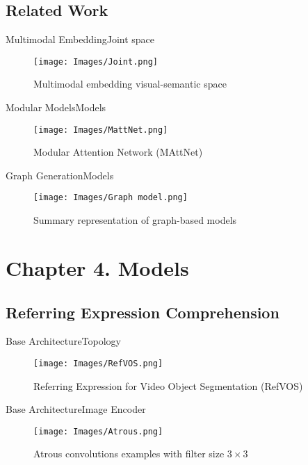 \documentclass{beamer}
\begin{document}
\subsection{Related Work}

\begin{frame}{Multimodal Embedding}{Joint space}
  \begin{figure}
    \texttt{[image: Images/Joint.png]}
    \caption{Multimodal embedding visual-semantic space}
  \end{figure}
\end{frame}

\begin{frame}{Modular Models}{Models}
  \begin{figure}
    \texttt{[image: Images/MattNet.png]}
    \caption{Modular Attention Network (MAttNet)}
  \end{figure}
\end{frame}

\begin{frame}{Graph Generation}{Models}
  \begin{figure}
    \texttt{[image: Images/Graph model.png]}
    \caption{Summary representation of graph-based models}
  \end{figure}
\end{frame}



\section{Chapter 4. Models}

\subsection{Referring Expression Comprehension}

\begin{frame}{Base Architecture}{Topology}
  \begin{figure}
    \texttt{[image: Images/RefVOS.png]}
    \caption{Referring Expression for Video Object Segmentation (RefVOS)}
  \end{figure}
\end{frame}

\begin{frame}{Base Architecture}{Image Encoder}
  \begin{figure}
    \texttt{[image: Images/Atrous.png]}
    \caption{Atrous convolutions examples with filter size \(3 \times 3\)}
  \end{figure}
\end{frame}
\end{document}
